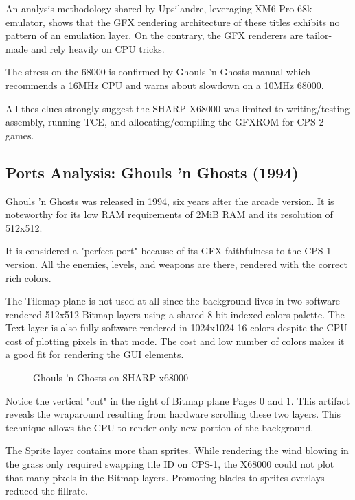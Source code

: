An analysis methodology shared by Upsilandre\cite{x68k_games_analysis}, leveraging XM6 Pro-68k emulator, shows that the GFX rendering architecture of these titles exhibits no pattern of an emulation layer. On the contrary, the GFX renderers are tailor-made and rely heavily on CPU tricks. 

\begin{trivia}
The stress on the 68000 is confirmed by Ghouls 'n Ghosts manual which recommends a 16MHz CPU and warns about slowdown on a 10MHz 68000.
\end{trivia}

All thes clues strongly suggest the SHARP X68000 was limited to writing/testing assembly, running TCE, and allocating/compiling the GFXROM for CPS-2 games.



\subsection{Ports Analysis: Ghouls 'n Ghosts (1994)}
Ghouls 'n Ghosts was released in 1994, six years after the arcade version. It is noteworthy for its low RAM requirements of 2MiB RAM and its resolution of 512x512.

It is considered a "perfect port" because of its GFX faithfulness to the CPS-1 version. All the enemies, levels, and weapons are there, rendered with the correct rich colors. 

The Tilemap plane is not used at all since the background lives in two software rendered 512x512 Bitmap layers using a shared 8-bit indexed colors palette. The Text layer is also fully software rendered in 1024x1024 16 colors despite the CPU cost of plotting pixels in that mode. The cost and low number of colors makes it a good fit for rendering the GUI elements.

\begin{figure}[H]
\caption*{Ghouls 'n Ghosts on SHARP x68000}
\end{figure}


Notice the vertical "cut" in the right of Bitmap plane Pages 0 and 1. This artifact reveals the wraparound resulting from hardware scrolling these two layers. This technique allows the CPU to render only new portion of the background. 

The Sprite layer contains more than sprites. While rendering the wind blowing in the grass only required swapping tile ID on CPS-1, the X68000 could not plot that many pixels in the Bitmap layers. Promoting blades to sprites overlays reduced the fillrate.

